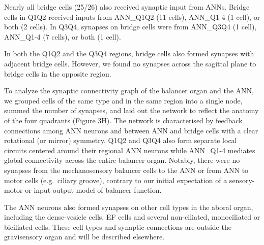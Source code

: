 \documentclass[
  11pt,
]{article}
\begin{document}
Nearly all bridge cells (25/26) also received synaptic input from ANNs.
Bridge cells in Q1Q2 received inputs from ANN\_Q1Q2 (11 cells),
ANN\_Q1-4 (1 cell), or both (2 cells). In Q3Q4, synapses on bridge cells
were from ANN\_Q3Q4 (1 cell), ANN\_Q1-4 (7 cells), or both (1 cell).

In both the Q1Q2 and the Q3Q4 regions, bridge cells also formed synapses
with adjacent bridge cells. However, we found no synapses across the
sagittal plane to bridge cells in the opposite region.

To analyze the synaptic connectivity graph of the balancer organ and the
ANN, we grouped cells of the same type and in the same region into a
single node, summed the number of synapses, and laid out the network to
reflect the anatomy of the four quadrants (Figure 3H). The network is
characterised by feedback connections among ANN neurons and between ANN
and bridge cells with a clear rotational (or mirror) symmetry. Q1Q2 and
Q3Q4 also form separate local circuits centered around their regional
ANN neurons while ANN\_Q1-4 mediates global connectivity across the
entire balancer organ. Notably, there were no synapses from the
mechanosensory balancer cells to the ANN or from ANN to motor cells
(e.g.~ciliary groove), contrary to our initial expectation of a
sensory-motor or input-output model of balancer function.

The ANN neurons also formed synapses on other cell types in the aboral
organ, including the dense-vesicle cells, EF cells and several
non-ciliated, monociliated or biciliated cells. These cell types and
synaptic connections are outside the gravisensory organ and will be
described elsewhere.
\end{document}
